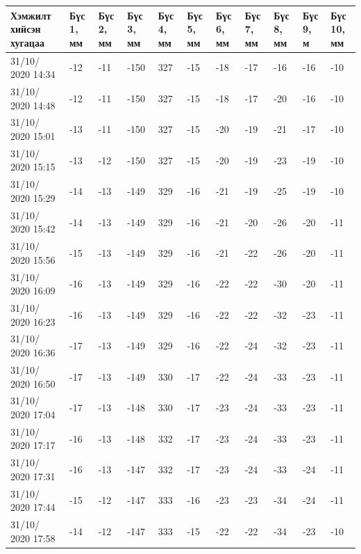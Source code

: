\begin{table}[h]
    \centering
    \begin{tabular}{|p{1.5cm}|p{0.8cm}|p{0.8cm}|p{0.8cm}|p{0.8cm}|p{0.8cm}|p{0.8cm}|p{0.8cm}|p{0.8cm}|p{0.8cm}|p{0.8cm}|}
         \hline
     Хэмжилт хийсэн хугацаа & Бүс 1, мм&	Бүс 2, мм&	Бүс 3, мм&	Бүс 4, мм&	Бүс 5, мм&	Бүс 6, мм&	Бүс 7, мм&	Бүс 8, мм&	Бүс 9, м&	Бүс 10, мм\\ \hline
31/10/ 2020 14:34&	-12&-11&-150&	327&-15&-18&-17&-16&-16&	-10\\ \hline
31/10/ 2020 14:48&	-12&-11&-150&	327&-15&-18&-17&-20&-16&	-10\\ \hline
31/10/ 2020 15:01&	-13&-11&-150&	327&-15&-20&-19&-21&-17&	-10\\ \hline
31/10/ 2020 15:15&	-13&-12&-150&	327&-15&-20&-19&-23&-19&	-10\\ \hline
31/10/ 2020 15:29&	-14&-13&-149&	329&-16&-21&-19&-25&-19&	-10\\ \hline
31/10/ 2020 15:42&	-14&-13&-149&	329&-16&-21&-20&-26&-20&	-11\\ \hline
31/10/ 2020 15:56&	-15&-13&-149&	329&-16&-21&-22&-26&-20&	-11\\ \hline
31/10/ 2020 16:09&	-16&-13&-149&	329&-16&-22&-22&-30&-20&	-11\\ \hline
31/10/ 2020 16:23&	-16&-13&-149&	329&-16&-22&-22&-32&-23&	-11\\ \hline
31/10/ 2020 16:36&	-17&-13&-149&	329&-16&-22&-24&-32&-23&	-11\\ \hline
31/10/ 2020 16:50&	-17&-13&-149&	330&-17&-22&-24&-33&-23&	-11\\ \hline
31/10/ 2020 17:04&	-17&-13&-148&	330&-17&-23&-24&-33&-23&	-11\\ \hline
31/10/ 2020 17:17&	-16&-13&-148&	332&-17&-23&-24&-33&-23&	-11\\ \hline
31/10/ 2020 17:31&	-16&-13&-147&	332&-17&-23&-24&-33&-24&	-11\\ \hline
31/10/ 2020 17:44&	-15&-12&-147&	333&-16&-23&-23&-34&-24&	-11\\ \hline
31/10/ 2020 17:58&	-14&-12&-147&	333&-15&-22&-22&-34&-23&	-10\\ \hline
    \end{tabular}
\end{table}
